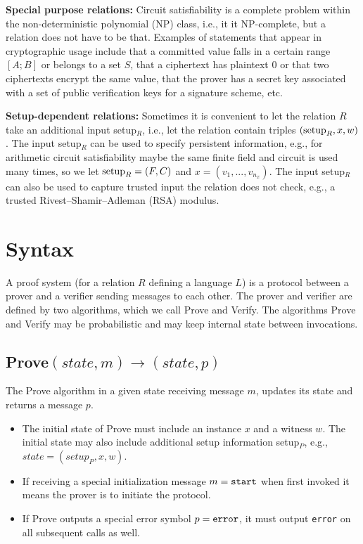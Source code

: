  
\textbf{Special purpose relations:} Circuit satisfiability is 
a complete problem within the non-deterministic polynomial (NP) class,
i.e., it it NP-complete,
but a relation does not have to be that. 
	Examples of statements that appear in cryptographic usage include that a committed value falls in a certain range $[A;B]$ or belongs to a set $S$, that a ciphertext has plaintext 0 or that two ciphertexts encrypt the same value, that the prover has a secret key associated with a set of public verification keys for a signature scheme, etc.
 
\textbf{Setup-dependent relations:} 
Sometimes it is convenient to let the relation $R$ take an additional input setup$_R$, i.e., let the relation contain triples $(\textmd{setup}_R, x, w)$. 
	The input setup$_R$ can be used to specify persistent information, e.g., 
for arithmetic circuit satisfiability maybe the same finite field and circuit is used many times, 
so we let $\textmd{setup}_R = (F, C)$ and $x = (v_1,...,v_{n_x})$.
	The input setup$_R$ can also be used to capture trusted input the relation does not check, 
e.g., a trusted Rivest--Shamir--Adleman (RSA)
modulus.
 

\section{Syntax}
\label{security:syntax}
 
A proof system (for a relation $R$ defining a language $L$) is a protocol between a prover and a verifier sending messages to each other. 
The prover and verifier are defined by two algorithms, which we call Prove and Verify. 
The algorithms Prove and Verify may be probabilistic and may keep internal state between invocations.



\subsection[Prove]{\textbf{Prove}$(state, m) \rightarrow (state, p)$}

The Prove algorithm in a given state receiving message $m$, updates its state and returns a message $p$.\loosen

\begin{itemize}
\item The initial state of Prove must include an instance $x$ and a witness $w$. 
	The initial state may also include additional setup information setup$_P$, e.g., $state = (setup_P, x, w)$.
\item If receiving a special initialization message $m = \tt start$ when first invoked it means the prover is to initiate the protocol.
\item If Prove outputs a special error symbol $p = \tt error$, it must output {\tt error} on all subsequent calls as well.
\end{itemize}


